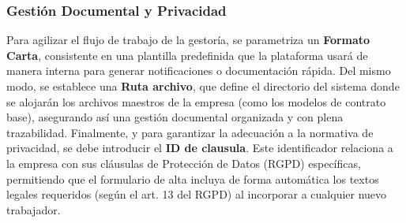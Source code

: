 \subsubsection{Gestión Documental y Privacidad}
Para agilizar el flujo de trabajo de la gestoría, se parametriza un \textbf{Formato Carta}, consistente en una plantilla predefinida que la plataforma usará de manera interna para generar notificaciones o documentación rápida. Del mismo modo, se establece una \textbf{Ruta archivo}, que define el directorio del sistema donde se alojarán los archivos maestros de la empresa (como los modelos de contrato base), asegurando así una gestión documental organizada y con plena trazabilidad. Finalmente, y para garantizar la adecuación a la normativa de privacidad, se debe introducir el \textbf{ID de clausula}. Este identificador relaciona a la empresa con sus cláusulas de Protección de Datos (RGPD) específicas, permitiendo que el formulario de alta incluya de forma automática los textos legales requeridos (según el art. 13 del RGPD) al incorporar a cualquier nuevo trabajador.
